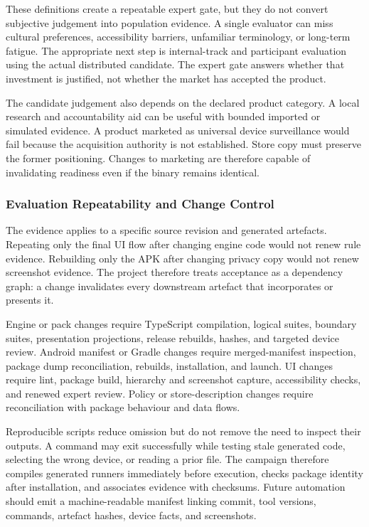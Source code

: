 These definitions create a repeatable expert gate, but they do not convert subjective judgement into population evidence. A single evaluator can miss cultural preferences, accessibility barriers, unfamiliar terminology, or long-term fatigue. The appropriate next step is internal-track and participant evaluation using the actual distributed candidate. The expert gate answers whether that investment is justified, not whether the market has accepted the product.

The candidate judgement also depends on the declared product category. A local research and accountability aid can be useful with bounded imported or simulated evidence. A product marketed as universal device surveillance would fail because the acquisition authority is not established. Store copy must preserve the former positioning. Changes to marketing are therefore capable of invalidating readiness even if the binary remains identical.

\subsubsection{Evaluation Repeatability and Change Control}

The evidence applies to a specific source revision and generated artefacts. Repeating only the final UI flow after changing engine code would not renew rule evidence. Rebuilding only the APK after changing privacy copy would not renew screenshot evidence. The project therefore treats acceptance as a dependency graph: a change invalidates every downstream artefact that incorporates or presents it.

Engine or pack changes require TypeScript compilation, logical suites, boundary suites, presentation projections, release rebuilds, hashes, and targeted device review. Android manifest or Gradle changes require merged-manifest inspection, package dump reconciliation, rebuilds, installation, and launch. UI changes require lint, package build, hierarchy and screenshot capture, accessibility checks, and renewed expert review. Policy or store-description changes require reconciliation with package behaviour and data flows.

Reproducible scripts reduce omission but do not remove the need to inspect their outputs. A command may exit successfully while testing stale generated code, selecting the wrong device, or reading a prior file. The campaign therefore compiles generated runners immediately before execution, checks package identity after installation, and associates evidence with checksums. Future automation should emit a machine-readable manifest linking commit, tool versions, commands, artefact hashes, device facts, and screenshots.

